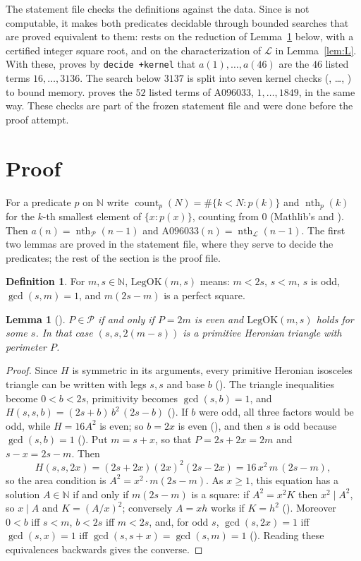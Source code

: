 \documentclass[11pt]{amsart}
\theoremstyle{plain}
\newtheorem{lemma}[theorem]{Lemma}
\theoremstyle{definition}
\newtheorem{definition}[theorem]{Definition}
\newcommand{\N}{\mathbb{N}}
\newcommand{\Per}{\mathcal{P}}
\newcommand{\Leg}{\mathcal{L}}
\newcommand{\LegOK}{\mathrm{LegOK}}
\DeclareMathOperator{\cnt}{count}
\DeclareMathOperator{\nth}{nth}
\begin{document}
The statement file checks the definitions against the data. Since  is not computable, it makes both predicates decidable through bounded searches that are proved equivalent to them:  rests on the reduction of Lemma~\ref{lem:legok} below, with a certified integer square root, and  on the characterization of $\Leg$ in Lemma~\ref{lem:L}. With these,  proves by \texttt{decide +kernel} that $a(1),\dots,a(46)$ are the $46$ listed terms $16,\dots,3136$. The search below $3137$ is split into seven kernel checks (, \dots, ) to bound memory.  proves the $52$ listed terms of A096033, $1,\dots,1849$, in the same way. These checks are part of the frozen statement file and were done before the proof attempt.

\section{Proof}\label{sec:proof}

For a predicate $p$ on $\N$ write $\cnt_p(N)=\#\{k<N: p(k)\}$ and $\nth_p(k)$ for the $k$-th smallest element of $\{x:p(x)\}$, counting from $0$ (Mathlib's  and ). Then $a(n)=\nth_\Per(n-1)$ and $\mathrm{A096033}(n)=\nth_\Leg(n-1)$. The first two lemmas are proved in the statement file, where they serve to decide the predicates; the rest of the section is the proof file.

\begin{definition}\label{def:legok}
For $m,s\in\N$, $\LegOK(m,s)$ means: $m<2s$, $s<m$, $s$ is odd, $\gcd(s,m)=1$, and $m(2s-m)$ is a perfect square.
\end{definition}

\begin{lemma}[]\label{lem:legok}
$P\in\Per$ if and only if $P=2m$ is even and $\LegOK(m,s)$ holds for some $s$. In that case $(s,s,2(m-s))$ is a primitive Heronian triangle with perimeter $P$.
\end{lemma}

\begin{proof}
Since $H$ is symmetric in its arguments, every primitive Heronian isosceles triangle can be written with legs $s,s$ and base $b$ (). The triangle inequalities become $0<b<2s$, primitivity becomes $\gcd(s,b)=1$, and $H(s,s,b)=(2s+b)\,b^2\,(2s-b)$ (). If $b$ were odd, all three factors would be odd, while $H=16A^2$ is even; so $b=2x$ is even (), and then $s$ is odd because $\gcd(s,b)=1$ (). Put $m=s+x$, so that $P=2s+2x=2m$ and $s-x=2s-m$. Then
\[
  H(s,s,2x)=(2s+2x)(2x)^2(2s-2x)=16\,x^2\,m\,(2s-m),
\]
so the area condition is $A^2=x^2\cdot m(2s-m)$. As $x\ge1$, this equation has a solution $A\in\N$ if and only if $m(2s-m)$ is a square: if $A^2=x^2K$ then $x^2\mid A^2$, so $x\mid A$ and $K=(A/x)^2$; conversely $A=xh$ works if $K=h^2$ (). Moreover $0<b$ iff $s<m$, $b<2s$ iff $m<2s$, and, for odd $s$, $\gcd(s,2x)=1$ iff $\gcd(s,x)=1$ iff $\gcd(s,s+x)=\gcd(s,m)=1$ (). Reading these equivalences backwards gives the converse.
\end{proof}
\end{document}
